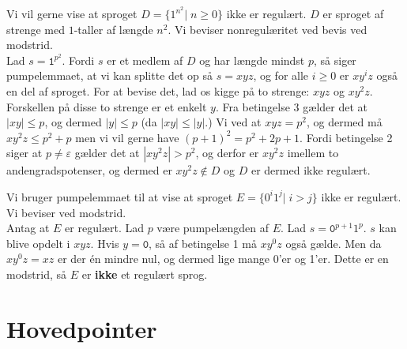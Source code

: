 \begin{example}
  Vi vil gerne vise at sproget $D = \{1^{n^{2}}|\; n \geq 0\}$ ikke er regulært. $D$ er sproget af strenge med $1$-taller af længde $n^{2}$. Vi beviser nonregulæritet ved bevis ved modstrid.\\
  Lad $s = \mathtt{1}^{p^{2}}$. Fordi $s$ er et medlem af $D$ og har længde mindst $p$, så siger pumpelemmaet, at vi kan splitte det op så $s = xyz$, og for alle $i \geq 0$ er $xy^{i}z$ også en del af sproget. For at bevise det, lad os kigge på to strenge: $xyz$ og $xy^{2}z$. Forskellen på disse to strenge er et enkelt $y$. Fra betingelse 3 gælder det at $|xy| \leq p$, og dermed $|y| \leq p$ (da $|xy| \leq |y|$.) Vi ved at $xyz = p^{2}$, og dermed må $xy^{2}z \leq p^{2} + p$ men vi vil gerne have $(p+1)^{2} = p^{2}+2p+1$. Fordi betingelse 2 siger at $p \neq \varepsilon$ gælder det at $|xy^{2}z| > p^{2}$, og derfor er $xy^{2}z$ imellem to andengradspotenser, og dermed er $xy^{2}z \notin D$ og $D$ er dermed ikke regulært.
\end{example}

\begin{example}
  Vi bruger pumpelemmaet til at vise at sproget $E = \{0^{i}1^{j}|\;i>j\}$ ikke er regulært. Vi beviser ved modstrid. \\
  Antag at  $E$ er regulært. Lad $p$ være pumpelængden af $E$. Lad $s = \mathtt{0}^{p+1}1^{p}$. $s$ kan blive opdelt i $xyz$. Hvis $y = \mathtt{0}$, så af betingelse 1 må $xy^{0}z$ også gælde. Men da $xy^{0}z = xz$ er der én mindre nul, og dermed lige mange 0'er og 1'er. Dette er en modstrid, så $E$ er \textbf{ikke} et regulært sprog.

\end{example}

\newpage
\section{Hovedpointer}%
\label{sec:hovedpointer}

